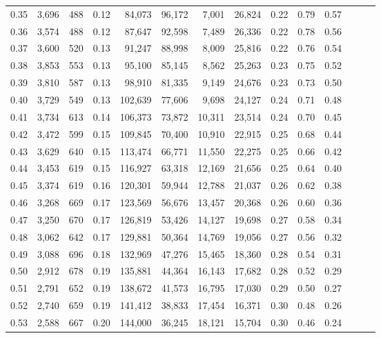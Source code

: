 \begin{tabular}{rrrrrrrrrrrrrr}
0.35 &  3,696 &  488 &  0.12 &   84,073 &   96,172 &   7,001 &  26,824 &  0.22 &  0.79 &      0.57 \\
0.36 &  3,574 &  488 &  0.12 &   87,647 &   92,598 &   7,489 &  26,336 &  0.22 &  0.78 &      0.56 \\
0.37 &  3,600 &  520 &  0.13 &   91,247 &   88,998 &   8,009 &  25,816 &  0.22 &  0.76 &      0.54 \\
0.38 &  3,853 &  553 &  0.13 &   95,100 &   85,145 &   8,562 &  25,263 &  0.23 &  0.75 &      0.52 \\
0.39 &  3,810 &  587 &  0.13 &   98,910 &   81,335 &   9,149 &  24,676 &  0.23 &  0.73 &      0.50 \\
0.40 &  3,729 &  549 &  0.13 &  102,639 &   77,606 &   9,698 &  24,127 &  0.24 &  0.71 &      0.48 \\
0.41 &  3,734 &  613 &  0.14 &  106,373 &   73,872 &  10,311 &  23,514 &  0.24 &  0.70 &      0.45 \\
0.42 &  3,472 &  599 &  0.15 &  109,845 &   70,400 &  10,910 &  22,915 &  0.25 &  0.68 &      0.44 \\
0.43 &  3,629 &  640 &  0.15 &  113,474 &   66,771 &  11,550 &  22,275 &  0.25 &  0.66 &      0.42 \\
0.44 &  3,453 &  619 &  0.15 &  116,927 &   63,318 &  12,169 &  21,656 &  0.25 &  0.64 &      0.40 \\
0.45 &  3,374 &  619 &  0.16 &  120,301 &   59,944 &  12,788 &  21,037 &  0.26 &  0.62 &      0.38 \\
0.46 &  3,268 &  669 &  0.17 &  123,569 &   56,676 &  13,457 &  20,368 &  0.26 &  0.60 &      0.36 \\
0.47 &  3,250 &  670 &  0.17 &  126,819 &   53,426 &  14,127 &  19,698 &  0.27 &  0.58 &      0.34 \\
0.48 &  3,062 &  642 &  0.17 &  129,881 &   50,364 &  14,769 &  19,056 &  0.27 &  0.56 &      0.32 \\
0.49 &  3,088 &  696 &  0.18 &  132,969 &   47,276 &  15,465 &  18,360 &  0.28 &  0.54 &      0.31 \\
0.50 &  2,912 &  678 &  0.19 &  135,881 &   44,364 &  16,143 &  17,682 &  0.28 &  0.52 &      0.29 \\
0.51 &  2,791 &  652 &  0.19 &  138,672 &   41,573 &  16,795 &  17,030 &  0.29 &  0.50 &      0.27 \\
0.52 &  2,740 &  659 &  0.19 &  141,412 &   38,833 &  17,454 &  16,371 &  0.30 &  0.48 &      0.26 \\
0.53 &  2,588 &  667 &  0.20 &  144,000 &   36,245 &  18,121 &  15,704 &  0.30 &  0.46 &      0.24 \\

\end{tabular}
